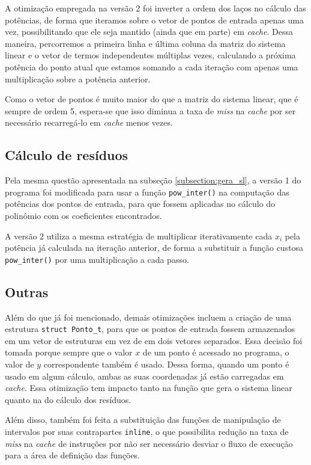\documentclass[a4paper, 11pt]{article}
\begin{document}
A otimização empregada na versão 2 foi inverter a ordem dos laços no cálculo
das potências, de forma que iteramos sobre o vetor de pontos de entrada apenas
uma vez, possibilitando que ele seja mantido (ainda que em parte) em
\textit{cache}. Dessa maneira, percorremos a primeira linha e última coluna da
matriz do sistema linear e o vetor de termos independentes múltiplas vezes,
calculando a próxima potência do ponto atual que estamos somando a cada
iteração com apenas uma multiplicação sobre a potência anterior.

Como o vetor de pontos é muito maior do que a matriz do sistema linear, que é
sempre de ordem 5, espera-se que isso diminua a taxa de \textit{miss} na
\textit{cache} por ser necessário recarregá-lo em \textit{cache} menos vezes.

\subsection{Cálculo de resíduos}
Pela mesma questão apresentada na subseção \ref{subsection:gera_sl}, a versão
1 do programa foi modificada para usar a função \texttt{pow\_inter()} na
computação das potências dos pontos de entrada, para que fossem aplicadas no
cálculo do polinômio com os coeficientes encontrados.

A versão 2 utiliza a mesma estratégia de multiplicar iterativamente cada $x_i$
pela potência já calculada na iteração anterior, de forma a substituir a
função custosa \texttt{pow\_inter()} por uma multiplicação a cada passo.

\subsection{Outras}
Além do que já foi mencionado, demais otimizações incluem a criação de uma
estrutura \texttt{struct Ponto\_t}, para que os pontos de entrada fossem
armazenados em um vetor de estruturas em vez de em dois vetores separados.
Essa decisão foi tomada porque sempre que o valor $x$ de um ponto é acessado
no programa, o valor de $y$ correspondente também é usado. Dessa forma, quando
um ponto é usado em algum cálculo, ambas as suas coordenadas já estão carregadas
em \textit{cache}. Essa otimização tem impacto tanto na função que gera o
sistema linear quanto na do cálculo dos resíduos.

Além disso, também foi feita a substituição das funções de manipulação de
intervalos por suas contrapartes \texttt{inline}, o que possibilita redução na
taxa de \textit{miss} na \textit{cache} de instruções por não ser necessário
desviar o fluxo de execução para a área de definição das funções.
\end{document}
